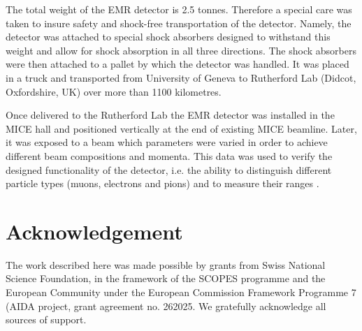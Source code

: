 \documentclass[a4paper,11pt]{article}
\begin{document}
The total weight of the EMR detector is 2.5 tonnes. Therefore a special care was taken to insure safety and shock-free transportation of the detector.
Namely, the detector was attached to special shock absorbers designed to withstand this weight and allow for shock absorption in all three directions. The
shock absorbers were then attached to a pallet by which the detector was handled. It was placed in a truck and transported from University of Geneva to
Rutherford Lab (Didcot, Oxfordshire, UK) over more than 1100 kilometres. 

Once delivered to the Rutherford Lab the EMR detector was installed in the MICE hall and positioned vertically at the end of existing MICE beamline. Later,
it was exposed to a beam which parameters were varied in order to achieve different beam compositions and momenta. This data was used to verify the designed
functionality of the detector, i.e. the ability to distinguish different particle types (muons, electrons and pions) and to measure their ranges
\cite{performance}. 

\section*{Acknowledgement}
The work described here was made possible by grants from Swiss National Science Foundation, in the framework of the SCOPES programme and the European Community
under the European Commission Framework Programme 7 (AIDA project, grant agreement no. 262025. We gratefully acknowledge all sources of support.




\end{document}
